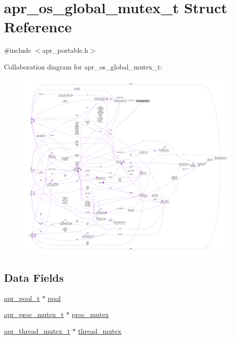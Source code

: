 \hypertarget{structapr__os__global__mutex__t}{}\section{apr\+\_\+os\+\_\+global\+\_\+mutex\+\_\+t Struct Reference}
\label{structapr__os__global__mutex__t}


{\ttfamily \#include $<$apr\+\_\+portable.\+h$>$}



Collaboration diagram for apr\+\_\+os\+\_\+global\+\_\+mutex\+\_\+t\+:
\nopagebreak
\begin{figure}[H]
\begin{center}
\leavevmode
\includegraphics[width=350pt]{structapr__os__global__mutex__t__coll__graph}
\end{center}
\end{figure}
\subsection*{Data Fields}
\begin{DoxyCompactItemize}
\item 
\hyperlink{structapr__pool__t}{apr\+\_\+pool\+\_\+t} $\ast$ \hyperlink{structapr__os__global__mutex__t_a13624705c6a07c55db295d2bfe2f94a9}{pool}
\item 
\hyperlink{structapr__proc__mutex__t}{apr\+\_\+proc\+\_\+mutex\+\_\+t} $\ast$ \hyperlink{structapr__os__global__mutex__t_aec060b8739b0d1b42360424216bbf399}{proc\+\_\+mutex}
\item 
\hyperlink{structapr__thread__mutex__t}{apr\+\_\+thread\+\_\+mutex\+\_\+t} $\ast$ \hyperlink{structapr__os__global__mutex__t_afafd671d5466f97b1e1539062f76940a}{thread\+\_\+mutex}
\end{DoxyCompactItemize}


